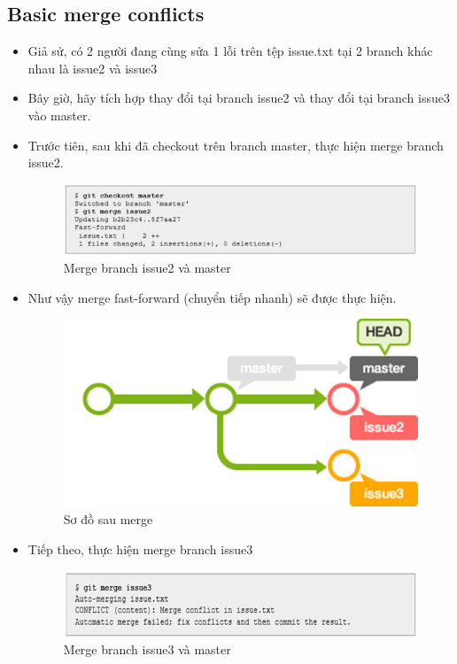 \documentclass[12pt,a4paper]{report}
\begin{document}
\subsection{Basic merge conflicts}
\begin{itemize}
\item Giả sử, có 2 người đang cùng sửa 1 lỗi trên tệp issue.txt tại 2 branch khác nhau là issue2 và issue3	
\item Bây giờ, hãy tích hợp thay đổi tại branch issue2 và thay đổi tại branch issue3 vào master.
\item Trước tiên, sau khi đã checkout trên branch master, thực hiện merge branch issue2.	

\begin{figure}[!ht]
	\centering
	\includegraphics[width=0.8\linewidth]{screenshot03}
\caption{Merge branch issue2 và master}
	\label{fig:screenshot03}
	\end{figure}
\newpage
\item Như vậy merge fast-forward (chuyển tiếp nhanh) sẽ được thực hiện.	

\begin{figure}[!ht]
	\centering
	\includegraphics[width=0.8\linewidth]{screenshot063}
\caption{Sơ đồ sau merge}
	\label{fig:screenshot063}
	\end{figure}
	
\item Tiếp theo, thực hiện merge branch issue3	

\begin{figure}[!ht]
	\centering
	\includegraphics[width=0.8\linewidth]{screenshot04}
\caption{Merge branch issue3 và master}
	\label{fig:screenshot04}
	\end{figure}


\end{itemize}
\end{document}
